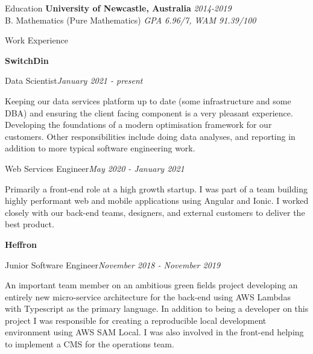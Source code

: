 \documentclass{resume} %
\begin{document}

\begin{rSection}{Education}
    {\bf University of Newcastle, Australia} \hfill {\em 2014-2019}
    \\ B. Mathematics (Pure Mathematics) \hfill {\em GPA 6.96/7, WAM 91.39/100}
\end{rSection}


\begin{rSection}{Work Experience}

{\bf SwitchDin}

\begin{adjustwidth}{2em}{}
    \begin{rSubsection}{Data Scientist}{\em January 2021 - present}{}{}
    \item  Keeping our data services platform up to date (some infrastructure and some DBA) and ensuring the client facing component is a very pleasant experience. Developing the foundations of a modern optimisation framework for our customers. Other responsibilities include doing data analyses, and reporting in addition to more typical software engineering work.
    \end{rSubsection}

    \begin{rSubsection}{Web Services Engineer}{\em May 2020 - January 2021}{}{}
    \item Primarily a front-end role at a high growth startup. I was part of a team building highly performant web and mobile applications using Angular and Ionic. I worked closely with our back-end teams, designers, and external customers to deliver the best product.
    \end{rSubsection}
\end{adjustwidth}

{\bf Heffron}

\begin{adjustwidth}{2em}{}
    \begin{rSubsection}{Junior Software Engineer}{\em November 2018 - November 2019}{}{}
    \item An important team member on an ambitious green fields project developing an entirely new micro-service architecture for the back-end using AWS Lambdas with Typescript as the primary language. In addition to being a developer on this project I was responsible for creating a reproducible local development environment using AWS SAM Local. I was also involved in the front-end helping to implement a CMS for the operations team.
    \end{rSubsection}


\end{adjustwidth}
\end{rSection}
\end{document}
